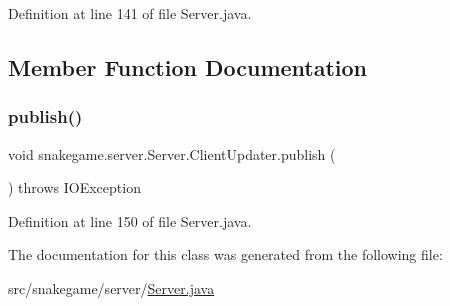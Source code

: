 Definition at line 141 of file Server.\+java.



\subsection{Member Function Documentation}
\mbox{\label{classsnakegame_1_1server_1_1_server_1_1_client_updater_a6a2031e0b0fdd55cf7d5c0eeb0b1e267}} 
\subsubsection{\texorpdfstring{publish()}{publish()}}
{\footnotesize\ttfamily void snakegame.\+server.\+Server.\+Client\+Updater.\+publish (\begin{DoxyParamCaption}{ }\end{DoxyParamCaption}) throws I\+O\+Exception}



Definition at line 150 of file Server.\+java.



The documentation for this class was generated from the following file\+:\begin{DoxyCompactItemize}
\item 
src/snakegame/server/\mbox{\hyperlink{_server_8java}{Server.\+java}}\end{DoxyCompactItemize}
